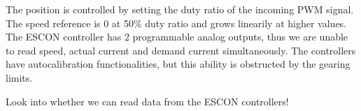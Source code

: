 The position is controlled by setting the duty ratio of the incoming PWM signal. The speed reference is 0 at 50\% duty ratio and grows linearily at higher values.
The ESCON controller has 2 programmable analog outputs, thus we are unable to read speed, actual current and demand current simultaneously.
The controllers have autocalibration functionalities, but this ability is obstructed by the gearing limits.


Look into whether we can read data from the ESCON controllers!
